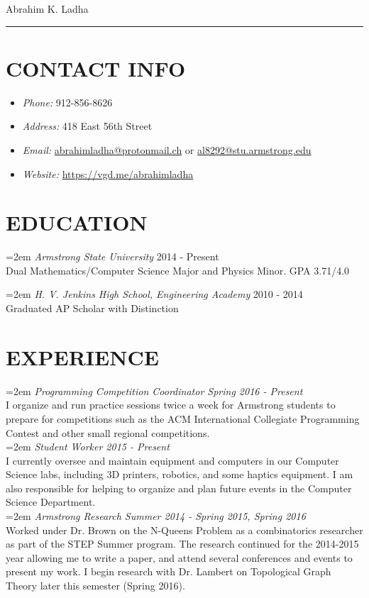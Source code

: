\documentclass[11pt]{article} %
\begin{document}
{\huge Abrahim K. Ladha}\\
\hrule
\section*{CONTACT INFO}
\begin{itemize}
  \setlength{\itemsep}{1pt}
  \setlength{\parskip}{0pt}
  \setlength{\parsep}{0pt}
\item \emph{Phone:} 912-856-8626
\item \emph{Address:} 418 East 56th Street
\item \emph{Email:}  \href{mailto:abrahimladha@protonmail.ch}{abrahimladha@protonmail.ch} or \href{mailto:al8292@stu.armstrong.edu}{al8292@stu.armstrong.edu}%
\item \emph{Website:}  \url{https://vgd.me/abrahimladha} %
\end{itemize}
\section*{EDUCATION}
\hangindent=2em
\emph{Armstrong State University} 2014 - Present\\
Dual Mathematics/Computer Science Major and Physics Minor. GPA 3.71/4.0

\hangindent=2em
\emph{H. V. Jenkins High School, Engineering Academy} 2010 - 2014\\
Graduated AP Scholar with Distinction
\section*{EXPERIENCE}
\hangindent=2em
\emph{Programming Competition Coordinator Spring 2016 - Present}\\
I organize and run practice sessions twice a week for Armstrong students to prepare for competitions such as the ACM International Collegiate Programming Contest and other small regional competitions.\\

\hangindent=2em
\emph{Student Worker 2015 - Present}\\
I currently oversee and maintain equipment and computers in our Computer Science labs, including 3D printers, robotics, and some haptics equipment. I am also responsible for helping to organize and plan future events in the Computer Science Department. \\

\hangindent=2em
\emph{Armstrong Research Summer 2014 - Spring 2015, Spring 2016}\\
Worked under Dr. Brown on the N-Queens Problem as a combinatorics researcher as part of the STEP Summer program. The research continued for the 2014-2015 year allowing me to write a paper, and attend several conferences and events to present my work. I begin research with Dr. Lambert on Topological Graph Theory later this semester (Spring 2016).\\
\end{document}
